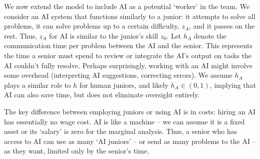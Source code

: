 \documentclass[12pt]{article}
\begin{document}
We now extend the model to include AI as a potential `worker' in the team. We consider an AI system that functions similarly to a junior: it attempts to solve all problems, it can solve problems up to a certain difficulty, $z_A$, and it passes on the rest. Thus, $z_A$ for AI is similar to the junior's skill $z_0$. Let $h_A$ denote the communication time per problem between the AI and the senior. This represents the time a senior must spend to review or integrate the AI's output on tasks the AI couldn't fully resolve. Perhaps surprisingly, working with an AI might involve some overhead (interpreting AI suggestions, correcting errors). We assume \(h_A\) plays a similar role to \(h\) for human juniors, and likely \(h_A \in (0,1)\), implying that AI can also save time, but does not eliminate oversight entirely.

The key difference between employing juniors or using AI is in costs: hiring an AI has essentially no wage cost. AI is like a machine -- we can assume it is a fixed asset or its `salary' is zero for the marginal analysis. Thus, a senior who has access to AI can use as many `AI juniors'  -- or send as many problems to the AI -- as they want, limited only by the senior's time.
\end{document}
